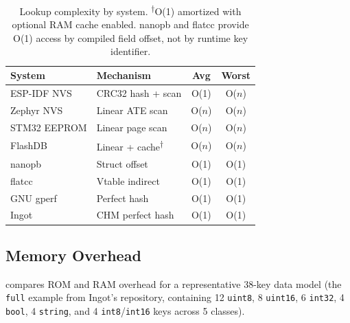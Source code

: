 \documentclass[10pt,twocolumn,letterpaper]{article}
\begin{document}
\begin{table}[t]
\centering
\footnotesize
\setlength{\tabcolsep}{3pt}
\begin{tabular}{@{}llcc@{}}
\toprule
\textbf{System} & \textbf{Mechanism} & \textbf{Avg} & \textbf{Worst} \\
\midrule
ESP-IDF NVS & CRC32 hash + scan & O(1) & O($n$) \\
Zephyr NVS & Linear ATE scan & O($n$) & O($n$) \\
STM32 EEPROM & Linear page scan & O($n$) & O($n$) \\
FlashDB & Linear + cache\textsuperscript{$\dagger$} & O($n$) & O($n$) \\
nanopb & Struct offset & O(1) & O(1) \\
flatcc & Vtable indirect & O(1) & O(1) \\
GNU gperf & Perfect hash & O(1) & O(1) \\
Ingot & CHM perfect hash & O(1) & O(1) \\
\bottomrule
\end{tabular}
\caption{Lookup complexity by system.
\textsuperscript{$\dagger$}O(1) amortized with optional RAM cache
enabled.  nanopb and flatcc provide O(1) access by compiled field
offset, not by runtime key identifier.}
\label{tab:lookup}
\end{table}

\subsection{Memory Overhead}

 compares ROM and RAM overhead for a representative
38-key data model (the \texttt{full} example from Ingot's repository,
containing 12 \texttt{uint8}, 8 \texttt{uint16}, 6 \texttt{int32}, 4
\texttt{bool}, 4 \texttt{string}, and 4 \texttt{int8}/\texttt{int16}
keys across 5 classes).
\end{document}
